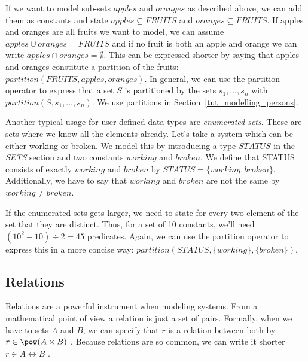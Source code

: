 
If we want to model sub-sets $apples$ and $oranges$ as described above, we can add them as
constants and state $apples \subseteq FRUITS$ and $oranges \subseteq FRUITS$.
If apples and oranges are all fruits we want to model, we can assume $apples \cup oranges = FRUITS$
and if no fruit is both an apple and orange we can write $apples \cap oranges = \emptyset$.
This can be expressed shorter by saying that apples and oranges constitute a
partition of the fruits: $partition(FRUITS,apples,oranges)$.
In general, we can use the partition operator to express that a set $S$ is partitioned by the
sets $s_1,\ldots,s_n$ with $partition(S,s_1,\ldots,s_n)$.  We use partitions in Section~\ref{tut_modelling_persons}.

Another typical usage for user defined data types are \emph{enumerated sets}.
These are sets where we know all the elements already. Let's take a system which can be either working or broken.
We model this by introducing a type $STATUS$ in the \textsl{SETS} section and two constants
$working$ and $broken$.
We define that STATUS consists of exactly $working$ and $broken$ by $STATUS = \{working,broken\}$.
Additionally, we have to say that $working$ and $broken$ are not the same by $working \neq broken$.

If the enumerated sets gets larger, we need to state for every two element of the set that they are
distinct. Thus, for a set of 10 constants, we'll need $(10^2-10)\div 2 = 45$ predicates.
Again, we can use the partition operator to express this in a more concise way: $partition(STATUS,\{working\},\{broken\})$.

\subsection{Relations}
\label{tut_relations}
Relations are a powerful instrument when modeling systems. From a mathematical point of view a
relation is just a set of pairs. Formally, when we have to sets $A$ and $B$, we can specify that
$r$ is a relation between both by $r \in \pow(A\cprod B)$ .
Because relations are so common, we can write it shorter $r \in A\rel B$ .

